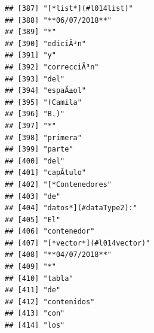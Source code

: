 \documentclass[
]{book}
\begin{document}
\begin{verbatim}
## [387] "[*list*](#l014list)"                                                              
## [388] "**06/07/2018**"                                                                   
## [389] "*"                                                                                
## [390] "ediciÃ³n"                                                                         
## [391] "y"                                                                                
## [392] "correcciÃ³n"                                                                      
## [393] "del"                                                                              
## [394] "espaÃ±ol"                                                                         
## [395] "(Camila"                                                                          
## [396] "B.)"                                                                              
## [397] "*"                                                                                
## [398] "primera"                                                                          
## [399] "parte"                                                                            
## [400] "del"                                                                              
## [401] "capÃ­tulo"                                                                        
## [402] "[*Contenedores"                                                                   
## [403] "de"                                                                               
## [404] "datos*](#dataType2):"                                                             
## [405] "El"                                                                               
## [406] "contenedor"                                                                       
## [407] "[*vector*](#l014vector)"                                                          
## [408] "**04/07/2018**"                                                                   
## [409] "*"                                                                                
## [410] "tabla"                                                                            
## [411] "de"                                                                               
## [412] "contenidos"                                                                       
## [413] "con"                                                                              
## [414] "los"                                                                              

\end{verbatim}
\end{document}
